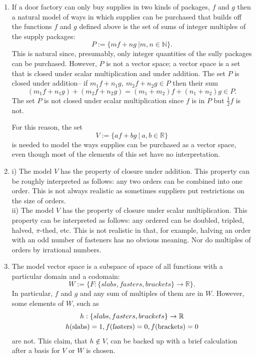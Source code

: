 \documentclass[12pt]{article}
\def\N{{\mathbb{N}}}
\def\R{{\mathbb{R}}}
\begin{document}
\begin{enumerate}
\begin{enumerate}
\item 
If a door factory can only buy supplies in two kinds of packages, $f$ and $g$ then a natural model of ways in which supplies can be purchased that builds off the functions $f$ and $g$ defined above is the set of sums of integer multiples of the supply packages:
\[P:= \{ mf+ng~\vert m,n\in \N \}. \]
This is natural since, presumably, only integer quantities of the sully packages can be purchased.
However, $P$ is not a vector space; 
a vector space is a set that is closed under scalar multiplication and under addition. 
The set $P$ is  closed under addition-- if $m_1f+n_1g,~m_2f+n_2g \in P$ then their sum  
\[
(m_1f+n_1g)+(m_2f+n_2g)=  
(m_1+m_2)f+(n_1+n_2)g  
\in P.\]
The set $P$ is not closed under scalar multiplication since $f$ is in $P$ but $\frac12 f$ is not. 

For this reason, the set 
\[V:= \{ af+bg~\vert ~a,b\in \R \}\]
is needed to model the ways supplies can be purchased as a vector space, even though most of the elements of this set have no interpretation.

\item 
i) The model $V$ has the property of closure under addition. This property can be roughly interpreted as follows: any two orders can be combined into one order. This is not always realistic as sometimes suppliers put restrictions on the size of orders. 
\\
ii) The model $V$ has the property of closure under scalar multiplication. 
This property can be interpreted as follows: any ordered can be doubled, tripled, halved, $\pi$-thed, etc. This is not realistic in that, for example, halving an order with an odd number of  fasteners has no obvious meaning. Nor do  multiples of orders by irrational numbers. 


\item 
The model vector space is a subspace of space of all functions with a particular domain and a codomain:
\[ W:=\{  F: \{ slabs, fasters,brackets \} \to \R \}.\]
In particular, 
$f$ and $g$ and any sum of multiples of them are in $W$.
However, some elements of $W$, such as 
\begin{gather*}h:\{ slabs, fasters,brackets \} \to \R \\
 h({\rm slabs})=1,f({\rm fasters})=0, f({\rm brackets})= 0\end{gather*}
are not. This claim, that $h\notin V$, can be backed up with a brief calculation after a basis for $V$ or $W$ is chosen. 


\end{enumerate}
\end{enumerate}
\end{document}
